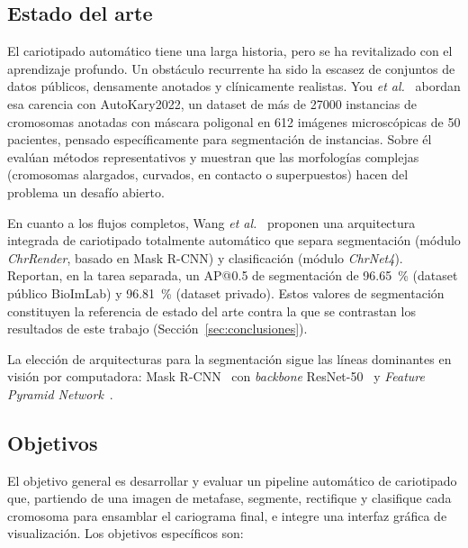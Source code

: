 \documentclass[11pt,a4paper]{article}
\begin{document}
\subsection{Estado del arte}

El cariotipado automático tiene una larga historia, pero se ha revitalizado con el
aprendizaje profundo. Un obstáculo recurrente ha sido la escasez de conjuntos de
datos públicos, densamente anotados y clínicamente realistas. You \textit{et
al.}~\cite{you2023autokary} abordan esa carencia con AutoKary2022, un
dataset de más de 27000 instancias de cromosomas anotadas con máscara poligonal en
612 imágenes microscópicas de 50 pacientes, pensado específicamente para
segmentación de instancias. Sobre él evalúan métodos representativos y muestran que
las morfologías complejas (cromosomas alargados, curvados, en contacto o
superpuestos) hacen del problema un desafío abierto.

En cuanto a los flujos completos, Wang \textit{et al.}~\cite{wang2024fully}
proponen una arquitectura integrada de cariotipado totalmente automático que separa
segmentación (módulo \textit{ChrRender}, basado en Mask R-CNN) y clasificación
(módulo \textit{ChrNet4}). Reportan, en la tarea separada, un AP@0.5 de
segmentación de \SI{96.65}{\percent} (dataset público BioImLab) y
\SI{96.81}{\percent} (dataset privado). Estos valores de segmentación constituyen
la referencia de estado del arte contra la que se contrastan los resultados de este
trabajo (Sección~\ref{sec:conclusiones}).

La elección de arquitecturas para la segmentación sigue las líneas dominantes en
visión por computadora: Mask R-CNN~\cite{he2017maskrcnn} con \textit{backbone}
ResNet-50~\cite{he2016resnet} y \textit{Feature Pyramid
Network}~\cite{lin2017fpn}.

\subsection{Objetivos}

El objetivo general es desarrollar y evaluar un pipeline automático de cariotipado
que, partiendo de una imagen de metafase, segmente, rectifique y clasifique cada
cromosoma para ensamblar el cariograma final, e integre una interfaz gráfica de
visualización. Los objetivos específicos son:
\end{document}
